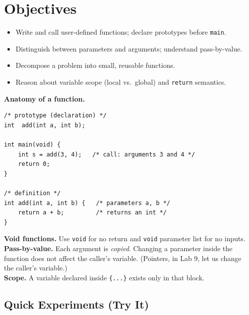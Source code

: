 \documentclass[11pt]{article}
\begin{document}
\labheader

\section*{Objectives}
\begin{itemize}[leftmargin=*,nosep]
  \item Write and call user-defined functions; declare prototypes before \texttt{main}.
  \item Distinguish between parameters and arguments; understand pass-by-value.
  \item Decompose a problem into small, reusable functions.
  \item Reason about variable scope (local vs.\ global) and \texttt{return} semantics.
\end{itemize}

\begin{summary}
\textbf{Anatomy of a function.}
\begin{lstlisting}
/* prototype (declaration) */
int  add(int a, int b);

int main(void) {
    int s = add(3, 4);   /* call: arguments 3 and 4 */
    return 0;
}

/* definition */
int add(int a, int b) {   /* parameters a, b */
    return a + b;         /* returns an int */
}
\end{lstlisting}

\textbf{Void functions.} Use \texttt{void} for no return and \texttt{void} parameter list for no inputs.\\
\textbf{Pass-by-value.} Each argument is \emph{copied}. Changing a parameter inside the function
does not affect the caller's variable. (Pointers, in Lab 9, let us change the caller's variable.)\\
\textbf{Scope.} A variable declared inside \texttt{\{...\}} exists only in that block.
\end{summary}

\subsection*{Quick Experiments (Try It)}
\end{document}
